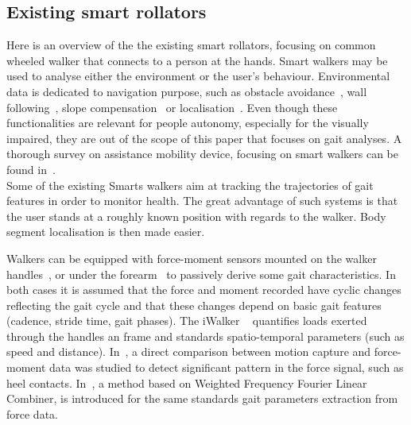 \documentclass[letterpaper, 10 pt, conference]{ieeeconf}
\begin{document}
\subsection{Existing smart rollators}

Here is an overview of the the existing smart rollators, focusing on common wheeled walker that connects to a person at the hands. Smart walkers may be used to analyse either the environment or  the user's behaviour. Environmental data is dedicated to navigation purpose, such as obstacle avoidance~\cite{Spenko06}, wall following~\cite{Yu2003}, slope compensation~\cite{Hirata2007} or localisation~\cite{Kotani1996,MacNamara00}. Even though these functionalities are relevant for people autonomy, especially for the visually impaired, they are out of the scope of this paper that focuses on gait analyses. A thorough survey on assistance mobility device, focusing on smart walkers can be found in~\cite{Frizera08,Martins11}.\\

Some of the existing Smarts walkers aim at tracking the trajectories of gait features in order to monitor health. The great advantage of such systems is that the user stands at a roughly known position with regards to the walker. Body segment localisation is then made easier.

Walkers can be equipped with force-moment sensors mounted on the walker handles~\cite{Alwan07,Tung10}, or under the forearm~\cite{Frizera08,Frizera10b} to passively derive some gait characteristics. In both cases it is assumed that the force and moment recorded have cyclic changes reflecting the gait cycle and that these changes depend on basic gait features (cadence, stride time, gait phases).  The iWalker ~\cite{Tung10} quantifies loads exerted through the handles an frame and standards spatio-temporal parameters (such as speed and distance). In~\cite{Alwan07}, a direct comparison between motion capture and force-moment data was studied to detect significant pattern in the force signal, such as heel contacts. %
In~\cite{Frizera10b}, a method based on Weighted Frequency Fourier Linear Combiner, is introduced for the same standards gait parameters extraction from force data.
\end{document}
